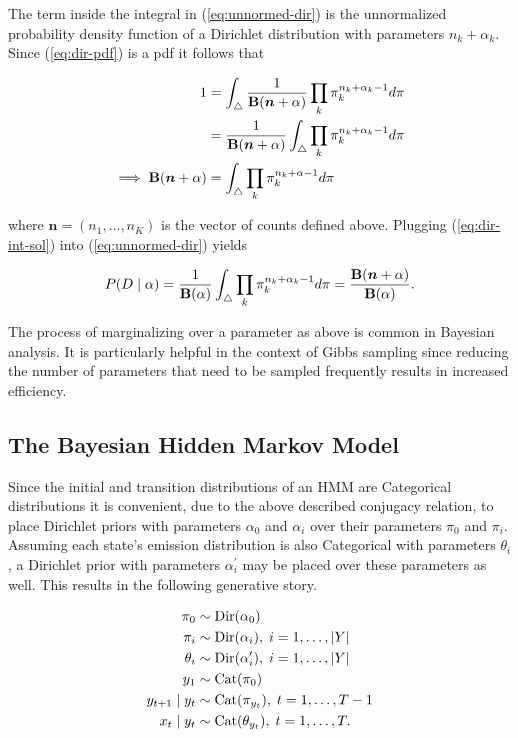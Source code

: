 \documentclass[12pt]{report}
\newcommand{\p}[0]{\prime}
\newcommand{\1}[0]{\mathbbm{1}}
\newcommand{\Cat}[0]{\textnormal{Cat}}
\newcommand{\Dir}[0]{\textnormal{Dir}}
\newcommand{\Bf}[0]{\text{\textbf{B}}}
\DeclarePairedDelimiter\abs{\lvert}{\rvert}%
\begin{document}
The term inside the integral in (\ref{eq:unnormed-dir}) is the unnormalized probability density function
of a Dirichlet distribution with parameters $n_k + \alpha_k$. Since (\ref{eq:dir-pdf})
is a pdf it follows that

\begin{align}
    1
    &= \int_\triangle \frac{1}{\Bf(\bm{n} + \alpha)} \prod_k \pi_k^{n_k + \alpha_k - 1} d \pi \nonumber \\
    &= \frac{1}{\Bf(\bm{n} + \alpha)} \int_\triangle \prod_k \pi_k^{n_k + \alpha_k - 1} d \pi \nonumber  \\
\implies \Bf(\bm{n} + \alpha) &= \int_\triangle \prod_k \pi_k^{n_k + \alpha - 1} d \pi \label{eq:dir-int-sol}
\end{align}

where $\bm{n} = (n_1, \ldots, n_K)$ is the vector of counts defined above.
Plugging (\ref{eq:dir-int-sol}) into (\ref{eq:unnormed-dir}) yields

\begin{equation}
    P(D \mid \alpha)
    = \frac{1}{\Bf(\alpha)}\int_{\triangle} \prod_k \pi_k^{n_k + \alpha_k - 1} d \pi
    = \frac{\Bf(\bm{n} + \alpha)}{\Bf(\alpha)}. \label{eq:dpcmarg}
\end{equation}

The process of marginalizing over a parameter as above is common in Bayesian analysis.
It is particularly helpful in the context of Gibbs sampling since reducing the number
of parameters that need to be sampled frequently results in increased efficiency.

\subsection{The Bayesian Hidden Markov Model}
Since the initial and transition distributions of an \ac{HMM} are Categorical distributions
it is convenient, due to the above described conjugacy relation, to place Dirichlet priors
with parameters $\alpha_0$ and $\alpha_i$ over their parameters $\pi_0$ and $\pi_i$.
Assuming each state's emission distribution is also Categorical
with parameters $\theta_i$, a Dirichlet prior with parameters $\alpha_i^\p$ may be placed
over these parameters as well. This results in the following generative story.

\begin{align*}
    \pi_0 & \sim \Dir(\alpha_0) \\
    \pi_i & \sim \Dir(\alpha_i),\; i = 1, \ldots, \abs{Y} \\
    \theta_i & \sim \Dir(\alpha_i^\p),\; i = 1, \ldots, \abs{Y} \\
    y_1 & \sim \Cat(\pi_0) \\
    y_{t+1} \mid y_t & \sim \Cat(\pi_{y_t}),\; t = 1, \ldots, T-1 \\
    x_t \mid y_t & \sim \Cat(\theta_{y_t}), \; t = 1, \ldots, T.
\end{align*}
\end{document}
